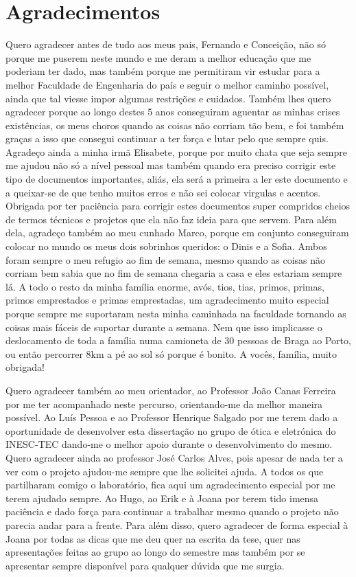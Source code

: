 \chapter*{Agradecimentos}
Quero agradecer antes de tudo aos meus pais, Fernando e Conceição, não só porque me puserem neste mundo e me deram a melhor educação que me poderiam ter dado, mas também porque me permitiram vir estudar para a melhor Faculdade de Engenharia do país e seguir o melhor caminho possível, ainda que tal viesse impor algumas restrições e cuidados. Também lhes quero agradecer porque ao longo destes 5 anos conseguiram aguentar as minhas crises existências, os meus choros quando as coisas não corriam tão bem, e foi também graças a isso que consegui continuar a ter força e lutar pelo que sempre quis. Agradeço ainda a minha irmã Elisabete, porque por muito chata que seja sempre me ajudou não só a nível pessoal mas também quando era preciso corrigir este tipo de documentos importantes, aliás, ela será a primeira a ler este documento e a queixar-se de que tenho muitos erros e não sei colocar virgulas e acentos. Obrigada por ter paciência para corrigir estes documentos super compridos cheios de termos técnicos e projetos que ela não faz ideia para que servem. Para além dela, agradeço também ao meu cunhado Marco, porque em conjunto conseguiram colocar no mundo os meus dois sobrinhos queridos: o Dinis e a Sofia. Ambos foram sempre o meu refugio ao fim de semana, mesmo quando as coisas não corriam bem sabia que no fim de semana chegaria a casa e eles estariam sempre lá. A todo o resto da minha família enorme, avós, tios, tias, primos, primas, primos emprestados e primas emprestadas, um agradecimento muito especial porque sempre me suportaram nesta minha caminhada na faculdade tornando as coisas mais fáceis de suportar durante a semana. Nem que isso implicasse o deslocamento de toda a família numa camioneta de 30 pessoas de Braga ao Porto, ou então percorrer 8km a pé ao sol só porque é bonito. A vocês, família, muito obrigada!

Quero agradecer também ao meu orientador, ao Professor João Canas Ferreira por me ter acompanhado neste percurso, orientando-me da melhor maneira possível. Ao Luís Pessoa e ao Professor Henrique Salgado por me terem dado a oportunidade de desenvolver esta dissertação no grupo de ótica e eletrónica do INESC-TEC dando-me o melhor apoio durante o desenvolvimento do mesmo. Quero agradecer ainda ao professor José Carlos Alves, pois apesar de nada ter a ver com o projeto ajudou-me sempre que lhe solicitei ajuda.  A todos os que partilharam comigo o laboratório, fica aqui um agradecimento especial por me terem ajudado sempre. Ao Hugo, ao Erik e à Joana por terem tido imensa paciência e dado força para continuar a trabalhar mesmo quando o projeto não parecia andar para a frente. Para além disso, quero agradecer de forma especial à Joana por todas as dicas que me deu quer na escrita da tese, quer nas apresentações feitas ao grupo ao longo do semestre mas também por se apresentar sempre disponível para qualquer dúvida que me surgia. 

